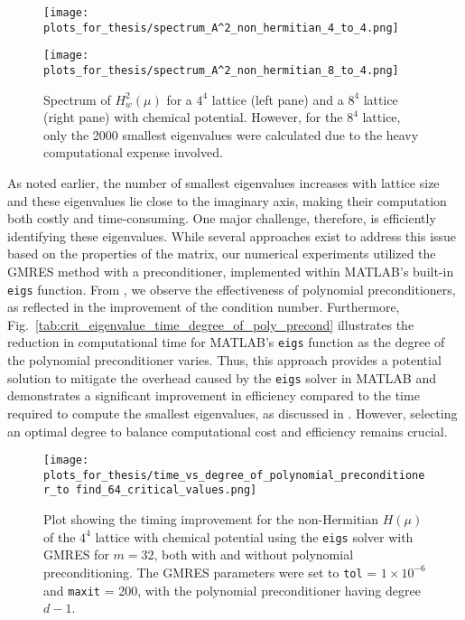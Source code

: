 \begin{figure}[H]
    \centering
    \begin{minipage}{0.45\textwidth}
        \centering
        \texttt{[image: plots\_for\_thesis/spectrum\_A^2\_non\_hermitian\_4\_to\_4.png]} %
    \end{minipage}%
    \hspace{0.02\textwidth} %
    \begin{minipage}{0.45\textwidth}
        \centering
        \texttt{[image: plots\_for\_thesis/spectrum\_A^2\_non\_hermitian\_8\_to\_4.png]} %
    \end{minipage}
    \caption{\small Spectrum of $H_w^2(\mu)$ for a $4^4$ lattice (left pane) and a $8^4$ lattice (right pane) with chemical potential. However, for the $8^4$ lattice, only the 2000 smallest eigenvalues were calculated due to the heavy computational expense involved.}
    \label{fig:spectrum_A^2}
\end{figure}

As noted earlier, the number of smallest eigenvalues increases with lattice size and these eigenvalues lie close to the imaginary axis, making their computation both costly and time-consuming. One major challenge, therefore, is efficiently identifying these eigenvalues. While several approaches exist to address this issue based on the properties of the matrix, our numerical experiments utilized the GMRES method with a preconditioner, implemented within MATLAB's built-in \texttt{eigs} function. From \cite{52}, we observe the effectiveness of polynomial preconditioners, as reflected in the improvement of the condition number. Furthermore, Fig.~\ref{tab:crit_eigenvalue_time_degree_of_poly_precond} illustrates the reduction in computational time for MATLAB’s \texttt{eigs} function as the degree of the polynomial preconditioner varies. Thus, this approach provides a potential solution to mitigate the overhead caused by the \texttt{eigs} solver in MATLAB and demonstrates a significant improvement in efficiency compared to the time required to compute the smallest eigenvalues, as discussed in \cite{52}. However, selecting an optimal degree to balance computational cost and efficiency remains crucial.

\begin{figure}[H]
    \centering
    \texttt{[image: plots\_for\_thesis/time\_vs\_degree\_of\_polynomial\_preconditioner\_to find\_64\_critical\_values.png]}
    \caption{\small Plot showing the timing improvement for the non-Hermitian $H(\mu)$ of the $4^4$ lattice with chemical potential using the \texttt{eigs} solver with GMRES for $m=32$, both with and without polynomial preconditioning. The GMRES parameters were set to \texttt{tol} = $1 \times 10^{-6}$ and \texttt{maxit} = 200, with the polynomial preconditioner having degree $d-1$.}
    \label{fig:crit_eigenvalue_time_degree_of_poly_precond} %
\end{figure}

